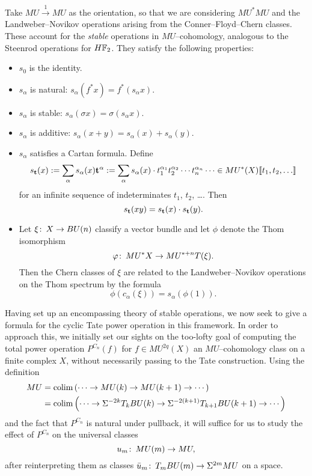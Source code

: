\begin{definition}
Take \(MU \xrightarrow{1} MU\) as the orientation, so that we are considering \(MU^* MU\) and the Landweber--Novikov operations arising from the Conner--Floyd--Chern classes.  These account for the \emph{stable} operations in \(MU\)--cohomology, analogous to the Steenrod operations for \(\HFtwo\).  They satisfy the following properties:
\begin{itemize}
\item \(s_0\) is the identity.
\item \(s_\alpha\) is natural: \(s_\alpha(f^* x) = f^*(s_\alpha x)\).
\item \(s_\alpha\) is stable: \(s_\alpha(\sigma x) = \sigma(s_\alpha x)\).
\item \(s_\alpha\) is additive: \(s_\alpha(x + y) = s_\alpha(x) + s_\alpha(y)\).
\item \(s_\alpha\) satisfies a Cartan formula.  Define \[s_{\mathbf t}(x) := \sum_{\alpha} s_\alpha(x) \mathbf t^\alpha := \sum_\alpha s_\alpha(x) \cdot t_1^{\alpha_1} t_2^{\alpha_2} \cdots t_n^{\alpha_n} \cdots \in MU^*(X)\llbracket{t_1, t_2, \ldots}\rrbracket\] for an infinite sequence of indeterminates \(t_1\), \(t_2\), \ldots.  Then \[s_{\mathbf t}(x y) = s_{\mathbf t}(x) \cdot s_{\mathbf t}(y).\]
\item Let \(\xi\colon\thinspace X \to BU(n)\) classify a vector bundle and let \(\phi\) denote the Thom isomorphism \[\varphi\colon\thinspace MU^* X \to MU^{*+n} T(\xi).\]  Then the Chern classes of \(\xi\) are related to the Landweber--Novikov operations on the Thom spectrum by the formula \[\phi(c_\alpha(\xi)) = s_\alpha(\phi(1)).\]
\end{itemize}
\end{definition}

Having set up an encompassing theory of stable operations, we now seek to give a formula for the cyclic Tate power operation in this framework.  In order to approach this, we initially set our sights on the too-lofty goal of computing the total power operation \(P^{C_n}(f)\) for \(f \in MU^{2q}(X)\) an \(MU\)--cohomology class on a finite complex \(X\), without necessarily passing to the Tate construction.  Using the definition
\begin{align*}
MU & = \operatorname*{colim} \left( \cdots \to MU(k) \to MU(k+1) \to \cdots \right) \\
& = \operatorname*{colim} \left( \cdots \to \Sigma^{-2k} T_k BU(k) \to \Sigma^{-2(k+1)} T_{k+1} BU(k+1) \to \cdots \right)
\end{align*}
and the fact that \(P^{C_n}\) is natural under pullback, it will suffice for us to study the effect of \(P^{C_n}\) on the universal classes \[u_m\colon\thinspace MU(m) \to MU,\] after reinterpreting them as classes \(\bar u_m\colon\thinspace T_m BU(m) \to \Sigma^{2m} MU\) on a space.

